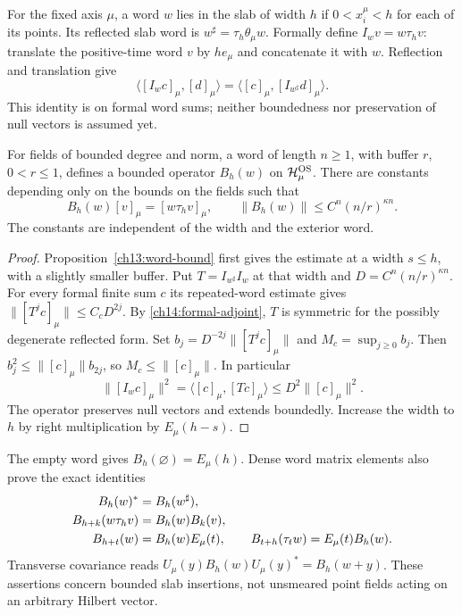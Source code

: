 For the fixed axis $\mu$, a word $w$ lies in the slab of width $h$ if $0<x_i^\mu<h$ for each
of its points. Its reflected slab word is
$w^\sharp=\tau_h\theta_\mu w$. Formally define
$I_wv=w\tau_hv$: translate the positive-time word $v$ by $he_\mu$
and concatenate it with $w$. Reflection and translation give
\begin{equation}\label{ch14:formal-adjoint}
 \langle[I_wc]_\mu,[d]_\mu\rangle
       =\langle[c]_\mu,[I_{w^\sharp}d]_\mu\rangle.
\end{equation}
This identity is on formal word sums; neither boundedness nor
preservation of null vectors is assumed yet.

\begin{proposition}\label{ch14:slab-bound}
For fields of bounded degree and norm, a word of length $n\ge1$,
with buffer $r$, $0<r\le1$,
defines a bounded operator $B_h(w)$ on $\mathcal H_\mu^{\rm OS}$.
There are constants depending only on the bounds on the fields such that
\[
 B_h(w)[v]_\mu=[w\tau_hv]_\mu,
 \qquad \|B_h(w)\|\le C^n(n/r)^{\kappa n}.
\]
The constants are independent of the width and the exterior word.
\end{proposition}

\begin{proof}
Proposition~\ref{ch13:word-bound} first gives the estimate at a
width $s\le h$, with a slightly smaller buffer. Put
$T=I_{w^\sharp}I_w$ at that width and
$D=C^n(n/r)^{\kappa n}$. For every formal finite sum $c$ its
repeated-word estimate gives
$\|[T^jc]_\mu\|\le C_cD^{2j}$. By
\eqref{ch14:formal-adjoint}, $T$ is symmetric for the possibly
degenerate reflected form. Set
$b_j=D^{-2j}\|[T^jc]_\mu\|$ and $M_c=\sup_{j\ge0}b_j$.
Then $b_j^2\le\|[c]_\mu\|b_{2j}$, so
$M_c\le\|[c]_\mu\|$. In particular
\[
 \|[I_wc]_\mu\|^2
 =\langle[c]_\mu,[Tc]_\mu\rangle
 \le D^2\|[c]_\mu\|^2.
\]
The operator preserves null vectors and extends boundedly. Increase
the width to $h$ by right multiplication by $E_\mu(h-s)$.
\end{proof}

The empty word gives $B_h(\varnothing)=E_\mu(h)$. Dense word
matrix elements also prove the exact identities
\begin{align}\label{ch14:slab-laws}
 B_h(w)^*&=B_h(w^\sharp),\\
 B_{h+k}(w\tau_hv)&=B_h(w)B_k(v),\notag\\
 B_{h+t}(w)&=B_h(w)E_\mu(t),\qquad
 B_{t+h}(\tau_tw)=E_\mu(t)B_h(w).\notag
\end{align}
Transverse covariance reads
$U_\mu(y)B_h(w)U_\mu(y)^*=B_h(w+y)$.
These assertions concern bounded slab insertions, not unsmeared
point fields acting on an arbitrary Hilbert vector.

